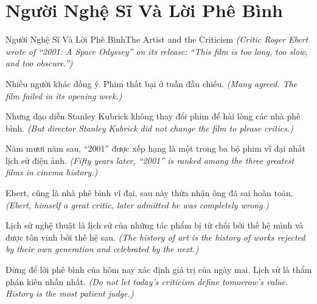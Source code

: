 \section{Người Nghệ Sĩ Và Lời Phê Bình}
\begin{truyen}{Người Nghệ Sĩ Và Lời Phê Bình}{The Artist and the Criticism}
\textit{(Critic Roger Ebert wrote of ``2001: A Space Odyssey'' on its release: ``This film is too long, too slow, and too obscure.'')}

Nhiều người khác đồng ý. Phim thất bại ở tuần đầu chiếu.
\textit{(Many agreed. The film failed in its opening week.)}

Nhưng đạo diễn Stanley Kubrick không thay đổi phim để hài lòng các nhà phê bình.
\textit{(But director Stanley Kubrick did not change the film to please critics.)}

Năm mươi năm sau, ``2001'' được xếp hạng là một trong ba bộ phim vĩ đại nhất lịch sử điện ảnh.
\textit{(Fifty years later, ``2001'' is ranked among the three greatest films in cinema history.)}

Ebert, cũng là nhà phê bình vĩ đại, sau này thừa nhận ông đã sai hoàn toàn.
\textit{(Ebert, himself a great critic, later admitted he was completely wrong.)}

Lịch sử nghệ thuật là lịch sử của những tác phẩm bị từ chối bởi thế hệ mình và được tôn vinh bởi thế hệ sau.
\textit{(The history of art is the history of works rejected by their own generation and celebrated by the next.)}

\end{truyen}

\begin{baihoc}
Đừng để lời phê bình của hôm nay xác định giá trị của ngày mai. Lịch sử là thẩm phán kiên nhẫn nhất.
\textit{(Do not let today's criticism define tomorrow's value. History is the most patient judge.)}
\end{baihoc}
\ngancach

